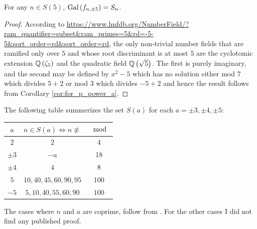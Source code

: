 \documentclass[../main.tex]{subfiles}
\begin{document}
\begin{corollary}
  For any $n \in S\left( 5 \right)$, $\operatorname{Gal}\left( f_{n,\pm5} \right) = S_n$.
\end{corollary}
\begin{proof}
  According to \url{https://www.lmfdb.org/NumberField/?ram_quantifier=subset&ram_primes=5&rd=-5-5&sort_order=rd&sort_order=rd}, the only non-trivial number fields that are ramified only over $5$ and whose root discriminant is at most $5$ are the cyclotomic extension $\mathbb{Q}\left( \zeta_5 \right)$ and the quadratic field $\mathbb{Q}\left( \sqrt{5} \right)$.
  The first is purely imaginary, and the second may be defined by $x^2 - 5$ which has no solution either mod $7$ which divides $5 + 2$ or mod $3$ which divides $-5 + 2$ and hence the result follows from Corollary \ref{cor:for_p_power_a}.
\end{proof}


The following table summerizes the set $S\left( a \right)$ for each $a = \pm 3, \pm 4, \pm 5$: 
\begin{center}
\begin{tabular}{||c c c||} 
 \hline
 $a$ & $n \in S\left( a \right) \Leftrightarrow n \not \equiv$ & $\mod$ \\ [0.5ex] 
 \hline\hline
 $2$ & $2$ & $4$ \\ 
 \hline
 $\pm 3$ & $-a$ & 18 \\
 \hline
 $\pm 4$ & $4$ & $8$ \\
 \hline
 $5$ & $10,40,45,60,90,95$ & $100$\\
 \hline
 $-5$ & $5,10,40,55,60,90$ & $100$ \\ [1ex] 
 \hline
\end{tabular}
\end{center}

\begin{remark}
  The cases where $n$ and $a$ are coprime, follow from \cite[Theorem 1]{Osada1987TheGG}.
  For the other cases I did not find any published proof.
\end{remark}


\end{document}
